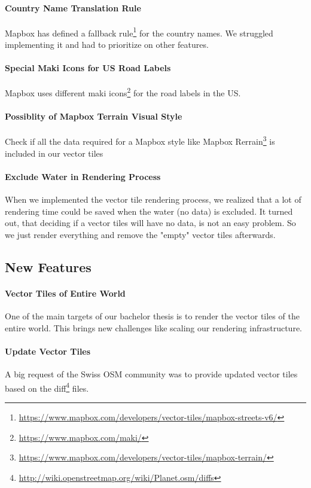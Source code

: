 \paragraph{Country Name Translation Rule}
Mapbox has defined a fallback rule\footnote{\url{https://www.mapbox.com/developers/vector-tiles/mapbox-streets-v6/}} for the country names. We struggled implementing it and had to prioritize on other features.

\paragraph{Special Maki Icons for US Road Labels}
Mapbox uses different maki icons\footnote{\url{https://www.mapbox.com/maki/}} for the road labels in the US.  

\paragraph{Possiblity of Mapbox Terrain Visual Style}
Check if all the data required for a Mapbox style like Mapbox Rerrain\footnote{\url{https://www.mapbox.com/developers/vector-tiles/mapbox-terrain/}} is included in our vector tiles

\paragraph{Exclude Water in Rendering Process}
When we implemented the vector tile rendering process, we realized that a lot of rendering time could be saved when the water (no data) is excluded. It turned out, that deciding if a vector tiles will have no data, is not an easy problem. So we just render everything and remove the "empty" vector tiles afterwards.  

\subsection{New Features}\label{new_features}

\paragraph{Vector Tiles of Entire World}
One of the main targets of our bachelor thesis is to render the vector tiles of the entire world. This brings new challenges like scaling our rendering infrastructure. 

\paragraph{Update Vector Tiles}
A big request of the Swiss OSM community was to provide updated vector tiles based on the diff\footnote{\url{http://wiki.openstreetmap.org/wiki/Planet.osm/diffs}} files.

